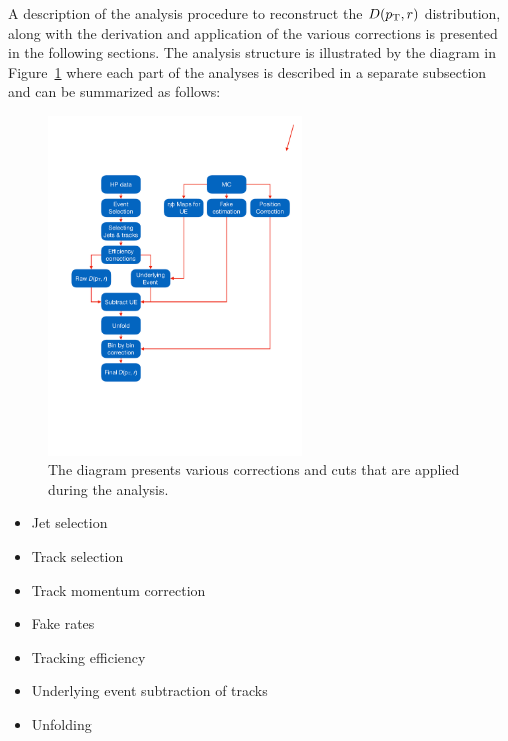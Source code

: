 
A description of the analysis procedure to reconstruct the $\mbox{$D( \mbox{$p_{\mathrm{T}}$}, r)$}$ distribution, along with the derivation and application of the various corrections is presented in the following sections.
The analysis structure is illustrated by the diagram in Figure~\ref{fig:analysis_flow} where each part of the analyses is described in a separate subsection and can be summarized as follows: 




\begin{figure}
\centering
\includegraphics[width=0.6\textwidth]{figures/main/general/Shape_analyses_flow}
\caption{The diagram presents various corrections and cuts that are applied during the analysis.}
\label{fig:analysis_flow}
\end{figure}


\begin{itemize}
\item Jet selection
\item Track selection
\item Track momentum correction
\item Fake rates
\item Tracking efficiency
\item Underlying event subtraction of tracks
\item Unfolding
\end{itemize}




